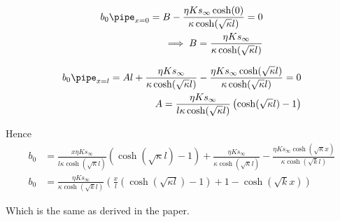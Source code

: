 \documentclass{X:/Documents/Coding/Latex/myassignment}
\begin{document}
\begin{align*}
	b_0\pipe_{x=0} = B - \frac{\eta Ks_{\infty}\cosh(0)}{\kappa\cosh(\sqrt{\kappa} l)} = 0\\
	\implies B =\frac{\eta Ks_{\infty}}{\kappa\cosh(\sqrt{\kappa} l)}
\end{align*}

\begin{align*}
	b_0\pipe_{x=l} = Al + \frac{\eta Ks_{\infty}}{\kappa\cosh(\sqrt{\kappa} l)} - \frac{\eta Ks_{\infty}\cosh(\sqrt{\kappa} l)}{\kappa\cosh(\sqrt{\kappa} l)} = 0\\
	A = \frac{\eta Ks_{\infty}}{l\kappa\cosh(\sqrt{\kappa} l)} \left(\cosh(\sqrt{\kappa} l) -1\right) \\
\end{align*}


Hence
\begin{align*}
	b_0 &= \frac{x\eta Ks_{\infty}}{l\kappa\cosh(\sqrt{\kappa} l)} \left(\cosh(\sqrt{\kappa} l) -1\right)+ \frac{\eta Ks_{\infty}}{\kappa\cosh(\sqrt{\kappa} l)} - \frac{\eta K s_{\infty}\cosh(\sqrt{\kappa} x)}{\kappa \cosh(\sqrt{k}l)}\\
	b_0 &=\frac{\eta K s_{\infty}}{\kappa\cosh(\sqrt{k}l)} \left(\frac xl(\cosh(\sqrt{\kappa l}) - 1) + 1 - \cosh(\sqrt{k}x)\right)
\end{align*}

Which is the same as derived in the paper.










\end{document}
